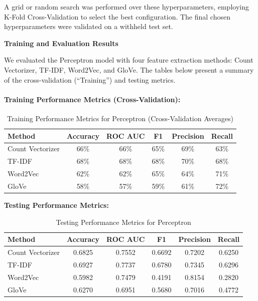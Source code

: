 A grid or random search was performed over these hyperparameters, employing K-Fold Cross-Validation to select the best configuration. The final chosen hyperparameters were validated on a withheld test set.

\textbf{Training and Evaluation Results}

We evaluated the Perceptron model with four feature extraction methods: Count Vectorizer, TF-IDF, Word2Vec, and GloVe. The tables below present a summary of the cross-validation (“Training”) and testing metrics.

\paragraph{Training Performance Metrics (Cross-Validation):}

\begin{table}[H]
    \centering
    \caption{Training Performance Metrics for Perceptron (Cross-Validation Averages)}
    \label{tab:perc-training-metrics}
    \begin{tabular}{|l|c|c|c|c|c|}
        \hline
        \textbf{Method} & \textbf{Accuracy} & \textbf{ROC AUC} & \textbf{F1} & \textbf{Precision} & \textbf{Recall} \\ 
        \hline
        Count Vectorizer & 66\% & 66\% & 65\% & 69\% & 63\% \\ 
        \hline
        TF-IDF & 68\% & 68\% & 68\% & 70\% & 68\% \\ 
        \hline
        Word2Vec & 62\% & 62\% & 65\% & 64\% & 71\% \\ 
        \hline
        GloVe & 58\% & 57\% & 59\% & 61\% & 72\% \\ 
        \hline
    \end{tabular}
\end{table}

\textbf{Testing Performance Metrics:}

\begin{table}[H]
    \centering
    \caption{Testing Performance Metrics for Perceptron}
    \label{tab:perc-testing-metrics}
    \begin{tabular}{|l|c|c|c|c|c|}
        \hline
        \textbf{Method} & \textbf{Accuracy} & \textbf{ROC AUC} & \textbf{F1} & \textbf{Precision} & \textbf{Recall} \\ 
        \hline
        Count Vectorizer & 0.6825 & 0.7552 & 0.6692 & 0.7202 & 0.6250 \\ 
        \hline
        TF-IDF & 0.6927 & 0.7737 & 0.6780 & 0.7345 & 0.6296 \\ 
        \hline
        Word2Vec & 0.5982 & 0.7479 & 0.4191 & 0.8154 & 0.2820 \\ 
        \hline
        GloVe & 0.6270 & 0.6951 & 0.5680 & 0.7016 & 0.4772 \\ 
        \hline
    \end{tabular}
\end{table}

